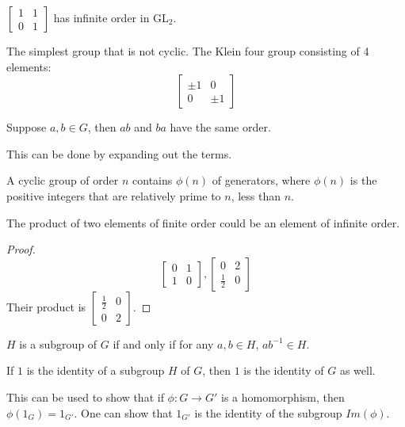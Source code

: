 \begin{example}
    $\begin{bmatrix}
        1&1\\
        0&1
    \end{bmatrix}$
    has infinite order in GL$_2$.
\end{example}
\begin{example}
    The simplest group that is not cyclic. The Klein four group consisting of 4 elements:
    \begin{equation*}
        \begin{bmatrix}
            \pm 1&0\\
            0 &\pm 1
        \end{bmatrix}
    \end{equation*}
\end{example}
\begin{prob}
    Suppose $a,b\in G$, then $ab$ and $ba$ have the same order.
\end{prob}
This can be done by expanding out the terms.

\begin{prob}
    A cyclic group of order $n$ contains $\phi(n)$ of generators, where $\phi(n)$ is the positive integers that are relatively prime to $n$, less than $n$.
\end{prob}

\begin{prob}
    The product of two elements of finite order could be an element of infinite order. 
\end{prob}
\begin{proof}
    \begin{equation*}
        \begin{bmatrix}
            0&1\\
            1&0
        \end{bmatrix},
        \begin{bmatrix}
            0&2\\
            \frac{1}{2}&0
        \end{bmatrix}
    \end{equation*}
    Their product is $\begin{bmatrix}
        \frac{1}{2}&0\\
        0&2
    \end{bmatrix}$.
\end{proof}

\begin{defn}[subgroup]
    $H$ is a subgroup of $G$ if and only if for any $a,b\in H$, $ab^{-1}\in H$.
\end{defn}
\begin{prop}
    If $1$ is the identity of a subgroup $H$ of $G$, then $1$ is the identity of $G$ as well.
\end{prop}
This can be used to show that if $\phi: G\to G'$ is a homomorphism, then $\phi(1_G)=1_{G'}$. One can show that $1_{G'}$ is the identity of the subgroup $Im(\phi)$.

